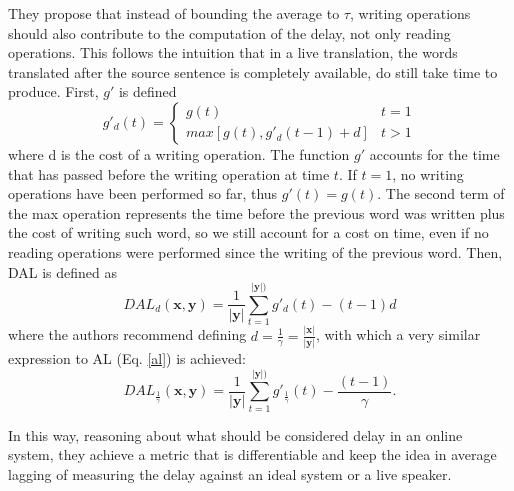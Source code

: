 \documentclass[11pt,english,listoffigures,listoftables]{tfgetsinf}
\newcommand{\vect}[1]{\mathbf{#1}}
\begin{document}
They propose that instead of bounding the average to $\tau$, writing operations should also contribute to the computation of the delay, not only reading operations. This follows the intuition that in a live translation, the words translated after the source sentence is completely available, do still take time to produce. First, $g'$ is defined  
\begin{equation}
    g'_d(t)=
    \begin{cases}
        g(t) &  t=1\\
        max\left[g(t),g'_d(t-1)+d\right] & t > 1 
    \end{cases}
\end{equation}
where d is the cost of a writing operation. The function $g'$ accounts for the time that has passed before the writing operation at time $t$. If $t=1$, no writing operations have been performed so far, thus $g'(t)=g(t)$. The second term of the max operation represents the time before the previous word was written plus the cost of writing such word, so we still account for a cost on time, even if no reading operations were performed since the writing of the previous word. Then, DAL is defined as
\begin{equation}
    DAL_d(\vect{x},\vect{y}) = \frac{1}{|\vect{y}|} \sum_{t=1}^{|\vect{y}|)} g'_d(t) - (t-1)d
\end{equation}
where the authors recommend defining $d = \frac{1}{\gamma} = \frac{|\vect{x}|}{|\vect{y}|}$, with which a very similar expression to AL (Eq. \ref{al}) is achieved:
\begin{equation}
    DAL_{\frac{1}{\gamma}}(\vect{x},\vect{y}) = \frac{1}{|\vect{y}|} \sum_{t=1}^{|\vect{y}|)} g'_{\frac{1}{\gamma}}(t) - \frac{(t-1)}{\gamma}.
\end{equation}

In this way, reasoning about what should be considered delay in an online system, they achieve a metric that is differentiable and keep the idea in average lagging of measuring the delay against an ideal system or a live speaker.
\end{document}
